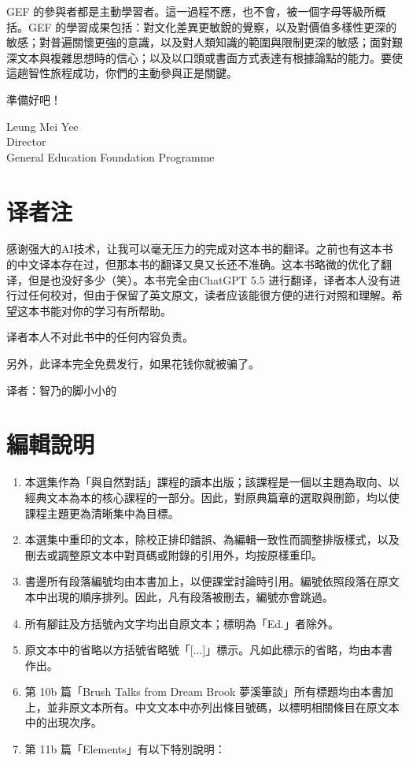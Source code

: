 \noindent GEF 的參與者都是主動學習者。這一過程不應，也不會，被一個字母等級所概括。GEF 的學習成果包括：對文化差異更敏銳的覺察，以及對價值多樣性更深的敏感；對普遍關懷更強的意識，以及對人類知識的範圍與限制更深的敏感；面對艱深文本與複雜思想時的信心；以及以口頭或書面方式表達有根據論點的能力。要使這趟智性旅程成功，你們的主動參與正是關鍵。

\noindent 準備好吧！

\vspace{1em}

\noindent Leung Mei Yee\\
Director\\
General Education Foundation Programme

\section*{译者注}

\noindent 感谢强大的AI技术，让我可以毫无压力的完成对这本书的翻译。之前也有这本书的中文译本存在过，但那本书的翻译又臭又长还不准确。这本书略微的优化了翻译，但是也没好多少（笑）。本书完全由ChatGPT 5.5 进行翻译，译者本人没有进行过任何校对，但由于保留了英文原文，读者应该能很方便的进行对照和理解。希望这本书能对你的学习有所帮助。

\noindent 译者本人不对此书中的任何内容负责。

\noindent 另外，此译本完全免费发行，如果花钱你就被骗了。

\hfill 译者：智乃的脚小小的




\section*{編輯說明}
\begin{enumerate}
\item 本選集作為「與自然對話」課程的讀本出版；該課程是一個以主題為取向、以經典文本為本的核心課程的一部分。因此，對原典篇章的選取與刪節，均以使課程主題更為清晰集中為目標。
\item 本選集中重印的文本，除校正排印錯誤、為編輯一致性而調整排版樣式，以及刪去或調整原文本中對頁碼或附錄的引用外，均按原樣重印。
\item 書邊所有段落編號均由本書加上，以便課堂討論時引用。編號依照段落在原文本中出現的順序排列。因此，凡有段落被刪去，編號亦會跳過。
\item 所有腳註及方括號內文字均出自原文本；標明為「Ed.」者除外。
\item 原文本中的省略以方括號省略號「[...]」標示。凡如此標示的省略，均由本書作出。
\item 第 10b 篇「Brush Talks from Dream Brook 夢溪筆談」所有標題均由本書加上，並非原文本所有。中文文本中亦列出條目號碼，以標明相關條目在原文本中的出現次序。
\item 第 11b 篇「Elements」有以下特別說明：
\end{enumerate}

